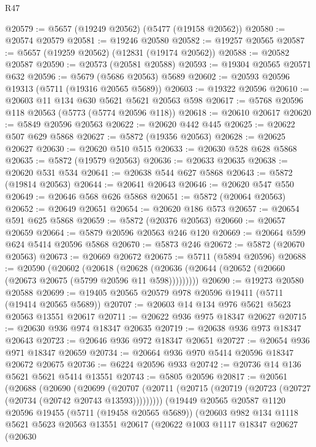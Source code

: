 \begin{lexlean}{R47}
\begin{coremodule}
@20579 := @5657 (@19249 @20562) (@5477 (@19158 @20562))
@20580 := @20574 @20579
@20581 := @19246 @20580
@20582 := @19257 @20565
@20587 := @5657 (@19259 @20562) (@12831 (@19174 @20562))
@20588 := @20582 @20587
@20590 := @20573 (@20581 @20588)
@20593 := @19304 @20565 @20571 @632
@20596 := @5679 (@5686 @20563) @5689
@20602 := @20593 @20596 @19313 (@5711 (@19316 @20565 @5689))
@20603 := @19322 @20596
@20610 := @20603 @11 @134 @630 @5621 @5621 @20563 @598
@20617 := @5768 @20596 @118 @20563 (@5773 (@5774 @20596 @118))
@20618 := @20610 @20617
@20620 := @5849 @20596 @20563
@20622 := @20620 @442 @445
@20625 := @20622 @507 @629 @5868
@20627 := @5872 (@19356 @20563)
@20628 := @20625 @20627
@20630 := @20620 @510 @515
@20633 := @20630 @528 @628 @5868
@20635 := @5872 (@19579 @20563)
@20636 := @20633 @20635
@20638 := @20620 @531 @534
@20641 := @20638 @544 @627 @5868
@20643 := @5872 (@19814 @20563)
@20644 := @20641 @20643
@20646 := @20620 @547 @550
@20649 := @20646 @568 @626 @5868
@20651 := @5872 (@20064 @20563)
@20652 := @20649 @20651
@20654 := @20620 @186 @573
@20657 := @20654 @591 @625 @5868
@20659 := @5872 (@20376 @20563)
@20660 := @20657 @20659
@20664 := @5879 @20596 @20563 @246 @120
@20669 := @20664 @599 @624 @5414 @20596 @5868
@20670 := @5873 @246
@20672 := @5872 (@20670 @20563)
@20673 := @20669 @20672
@20675 := @5711 (@5894 @20596)
@20688 := @20590
    (@20602
      (@20618 (@20628 (@20636 (@20644 (@20652 (@20660 (@20673 @20675 (@5799 @20596 @11 @598)))))))))
@20690 := @19273 @20580 @20588
@20699 := @19405 @20565 @20579 @978 @20596 @19411 (@5711 (@19414 @20565 @5689))
@20707 := @20603 @14 @134 @976 @5621 @5623 @20563 @13551 @20617
@20711 := @20622 @936 @975 @18347 @20627
@20715 := @20630 @936 @974 @18347 @20635
@20719 := @20638 @936 @973 @18347 @20643
@20723 := @20646 @936 @972 @18347 @20651
@20727 := @20654 @936 @971 @18347 @20659
@20734 := @20664 @936 @970 @5414 @20596 @18347 @20672 @20675
@20736 := @6224 @20596 @933
@20742 := @20736 @14 @136 @5621 @5621 @5414 @13551
@20743 := @5805 @20596
@20817 := @20561
    (@20688
      (@20690
        (@20699
          (@20707 (@20711 (@20715 (@20719 (@20723 (@20727 (@20734 (@20742 @20743 @13593)))))))))
        (@19449
          @20565
          @20587
          @1120
          @20596
          @19455
          (@5711 (@19458 @20565 @5689))
          (@20603
            @982
            @134
            @1118
            @5621
            @5623
            @20563
            @13551
            @20617
            (@20622
              @1003
              @1117
              @18347
              @20627
              (@20630

\end{coremodule}
\end{lexlean}
